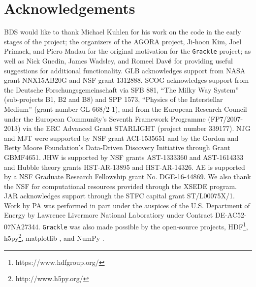\section*{Acknowledgements}

BDS would like to thank Michael Kuhlen for his work on the code in the
early stages of the project; the organizers of the AGORA project,
Ji-hoon Kim, Joel Primack, and Piero Madau for the original motivation
for the \texttt{Grackle} project; as well as Nick Gnedin, James
Wadsley, and Romeel Dav$\acute{\rm e}$ for providing useful
suggestions for additional functionality.  GLB acknowledges support
from NASA grant NNX15AB20G and NSF grant 1312888. SCOG acknowledges
support from the Deutsche Forschungsgemeinschaft via SFB 881, ``The
Milky Way System'' (sub-projects B1, B2 and B8) and SPP 1573,
``Physics of the Interstellar Medium'' (grant number GL 668/2-1), and
from the European Research Council under the European Community's
Seventh Framework Programme (FP7/2007-2013) via the ERC Advanced Grant
STARLIGHT (project number 339177).  NJG and MJT were supported by NSF
grant ACI-1535651 and by the Gordon and Betty Moore Foundation’s
Data-Driven Discovery Initiative through Grant GBMF4651.  JHW is
supported by NSF grants AST-1333360 and AST-1614333 and Hubble theory
grants HST-AR-13895 and HST-AR-14326.  AE is supported by a NSF
Graduate Research Fellowship grant No. DGE-16-44869. We also thank the
NSF for computational resources provided through the XSEDE
program. JAR acknowledges support through the STFC capital grant
ST/L00075X/1. Work by PA was performed in part under the auspices of
the U.S. Department of Energy by Lawrence Livermore National
Laboratiory under Contract DE-AC52-07NA27344.  \texttt{Grackle} was
also made possible by the open-source projects,
HDF\footnote{https://www.hdfgroup.org/},
h5py\footnote{http://www.h5py.org/}, matplotlib
\citep{2005ASPC..347...91B}, and NumPy \citep{numpy}.

